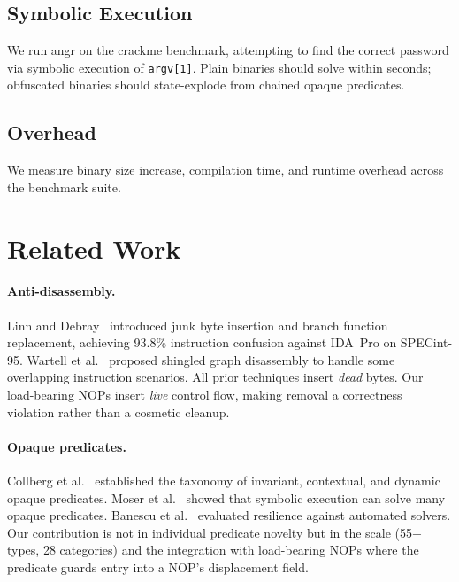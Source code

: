 \documentclass[letterpaper,twocolumn,10pt]{article}
\begin{document}
\subsection{Symbolic Execution}

We run angr on the crackme benchmark, attempting to find the correct password via symbolic execution of \texttt{argv[1]}. Plain binaries should solve within seconds; obfuscated binaries should state-explode from chained opaque predicates.

\subsection{Overhead}

We measure binary size increase, compilation time, and runtime overhead across the benchmark suite.

\section{Related Work}
\label{sec:related}

\paragraph{Anti-disassembly.} Linn and Debray~\cite{linn03} introduced junk byte insertion and branch function replacement, achieving 93.8\% instruction confusion against IDA~Pro on SPECint-95. Wartell et al.~\cite{wartell14} proposed shingled graph disassembly to handle some overlapping instruction scenarios. All prior techniques insert \emph{dead} bytes. Our load-bearing NOPs insert \emph{live} control flow, making removal a correctness violation rather than a cosmetic cleanup.

\paragraph{Opaque predicates.} Collberg et al.~\cite{collberg97} established the taxonomy of invariant, contextual, and dynamic opaque predicates. Moser et al.~\cite{moser07} showed that symbolic execution can solve many opaque predicates. Banescu et al.~\cite{banescu16} evaluated resilience against automated solvers. Our contribution is not in individual predicate novelty but in the scale (55+ types, 28 categories) and the integration with load-bearing NOPs where the predicate guards entry into a NOP's displacement field.
\end{document}
